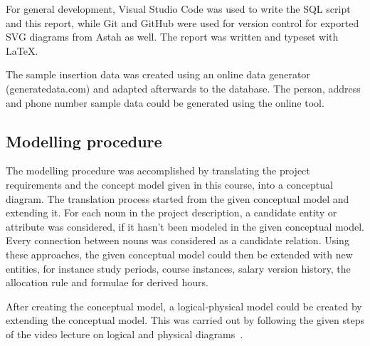 \documentclass[a4paper]{scrartcl}
\renewcommand{\_}{\textunderscore\allowbreak}
\begin{document}
For general development, Visual Studio Code was used to write the SQL script and this report, while Git and GitHub were used for version control for exported SVG diagrams from Astah as well. The report was written and typeset with \LaTeX.

The sample insertion data was created using an online data generator (generatedata.com) and adapted afterwards to the database. The person, address and phone number sample data could be generated using the online tool.

\subsection{Modelling procedure}
\label{sec:modelling}

The modelling procedure was accomplished by translating the project requirements and the concept model given in this course, into a conceptual diagram. The translation process started from the given conceptual model and extending it. For each noun in the project description, a candidate entity or attribute was considered, if it hasn't been modeled in the given conceptual model. Every connection between nouns was considered as a candidate relation. Using these approaches, the given conceptual model could then be extended with new entities, for instance study periods, course instances, salary version history, the allocation rule and formulae for derived hours.

After creating the conceptual model, a logical-physical model could be created by extending the conceptual model. This was carried out by following the given steps of the video lecture on logical and physical diagrams~\cite{logicallecture}.
\end{document}
